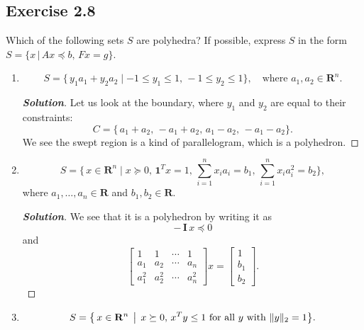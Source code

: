 \documentclass[12pt]{article}
\newenvironment{Solution}
  {\begin{proof}[\textbf{Solution}]}
  {\end{proof}}
\begin{document}
\subsection*{Exercise 2.8}
Which of the following sets \(S\) are polyhedra? If possible, express \(S\) in the form $S = \{x \, | \, Ax \preceq b , \, Fx = g\}$.
\vspace{0.1in}
\begin{enumerate}[label=(\alph*)]

	\item
	      \[
		      S = \{\,y_1 a_1 + y_2 a_2 \mid -1 \leq y_1 \leq 1,\,-1 \leq y_2 \leq 1\},
		      \quad
		      \text{where }a_1, a_2 \in \mathbf{R}^n.
	      \]

	      \begin{Solution}
		      Let us look at the boundary, where \(y_1\) and \(y_2\) are equal to their constraints:
		      \[
			      C
			      =
			      \{\,a_1 + a_2,\,-a_1 + a_2,\,
			      a_1 - a_2,\,-a_1 - a_2\}.
		      \]
		      We see the swept region is a kind of parallelogram, which is a polyhedron.
	      \end{Solution}

	\item
	      \[
		      S
		      =
		      \{\,x \in \mathbf{R}^n \mid x \succeq 0,\,
		      \mathbf{1}^T x = 1,\,
		      \sum_{i=1}^n x_i a_i = b_1,\,
		      \sum_{i=1}^n x_i a_i^2 = b_2\},
	      \]
	      where \(a_1,\dots,a_n \in \mathbf{R}\) and \(b_1, b_2 \in \mathbf{R}\).

	      \begin{Solution}
		      We see that it is a polyhedron by writing it as
		      \[
			      -\,\mathbf{I}\,x \preceq 0
		      \]
		      and
		      \[
			      \begin{bmatrix}
				      1     & 1     & \cdots & 1     \\
				      a_1   & a_2   & \cdots & a_n   \\
				      a_1^2 & a_2^2 & \cdots & a_n^2
			      \end{bmatrix}
			      x
			      =
			      \begin{bmatrix}
				      1   \\[6pt]
				      b_1 \\[6pt]
				      b_2
			      \end{bmatrix}.
		      \]
	      \end{Solution}

	\item
	      \[
		      S
		      =
		      \bigl\{\,
		      x \in \mathbf{R}^n
		      \,\bigm|\,
		      x \succeq 0,\,
		      x^T y \leq 1
		      \text{ for all }y\text{ with }\|y\|_2 = 1
		      \bigr\}.
	      \]


\end{enumerate}
\end{document}
